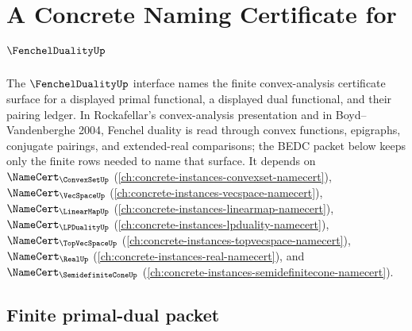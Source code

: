 \chapter{A Concrete Naming Certificate for $\FenchelDualityUp$}
\label{ch:concrete-instances-fenchelduality-namecert}

The $\FenchelDualityUp$ interface names the finite convex-analysis certificate surface for a displayed primal functional, a displayed dual functional, and their pairing ledger. In Rockafellar's convex-analysis presentation and in Boyd--Vandenberghe 2004, Fenchel duality is read through convex functions, epigraphs, conjugate pairings, and extended-real comparisons; the BEDC packet below keeps only the finite rows needed to name that surface. It depends on $\NameCert_{\ConvexSetUp}$ (\autoref{ch:concrete-instances-convexset-namecert}), $\NameCert_{\VecSpaceUp}$ (\autoref{ch:concrete-instances-vecspace-namecert}), $\NameCert_{\LinearMapUp}$ (\autoref{ch:concrete-instances-linearmap-namecert}), $\NameCert_{\LPDualityUp}$ (\autoref{ch:concrete-instances-lpduality-namecert}), $\NameCert_{\TopVecSpaceUp}$ (\autoref{ch:concrete-instances-topvecspace-namecert}), $\NameCert_{\RealUp}$ (\autoref{ch:concrete-instances-real-namecert}), and $\NameCert_{\SemidefiniteConeUp}$ (\autoref{ch:concrete-instances-semidefinitecone-namecert}).

\section{Finite primal-dual packet}
\label{sec:fenchelduality-finite-primal-dual-packet}


